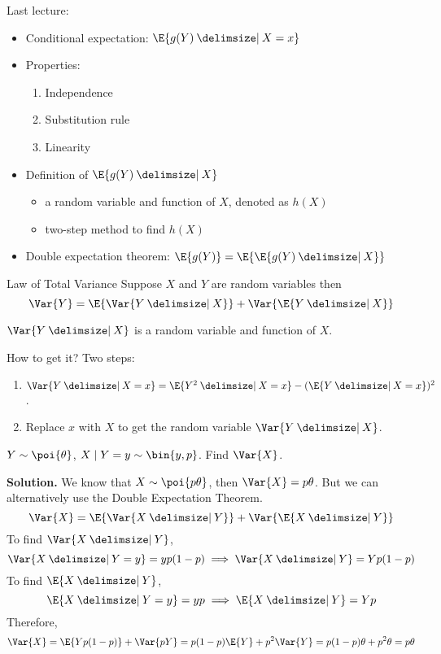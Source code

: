 Last lecture:
\begin{itemize}
    \item Conditional expectation: $ \E{g(Y)\given X=x} $
    \item Properties:
          \begin{enumerate}[label=(\arabic*)]
              \item Independence
              \item Substitution rule
              \item Linearity
          \end{enumerate}
    \item Definition of $ \E{g(Y)\given X} $
          \begin{itemize}
              \item a random variable and function of $ X $, denoted as $ h(X) $
              \item two-step method to find $ h(X) $
          \end{itemize}
    \item Double expectation theorem: $ \E{g(Y)}=\E{\E{g(Y)\given X}} $
\end{itemize}
\begin{Theorem}{Law of Total Variance}{}
    Suppose $ X $ and $ Y $ are random variables then
    \[ \Var{Y}=\E{\Var{Y\given X}}+\Var{\E{Y\given X}} \]
\end{Theorem}
\begin{Remark}{}{}
    $ \Var{Y\given X} $ is a random variable and function of $ X $.

    How to get it? Two steps:
    \begin{enumerate}
        \item $ \Var{Y\given X=x}=\E{Y^2\given X=x}-(\E{Y\given X=x})^2 $.
        \item Replace $ x $ with $ X $ to get
              the random variable $ \Var{Y\given X} $.
    \end{enumerate}
\end{Remark}
\begin{Example}{}{}
    $ Y \sim \poi{\theta} $, $ X\mid Y=y \sim \bin{y,p} $. Find
    $ \Var{X} $.

    \textbf{Solution.} We know that $ X \sim \poi{p\theta} $,
    then $ \Var{X}=p\theta $. But we can alternatively
    use the Double Expectation Theorem.
    \[ \Var{X}=\E{\Var{X\given Y}}+\Var{\E{X\given Y}} \]
    To find $ \Var{X\given Y} $,
    \[ \Var{X\given Y=y}=yp(1-p)\implies \Var{X\given Y}=Yp(1-p) \]
    To find $ \E{X\given Y} $,
    \[ \E{X\given Y=y}=yp\implies \E{X\given Y}=Yp \]
    Therefore,
    \[ \Var{X}=\E{Yp(1-p)}+\Var{pY}=p(1-p)\E{Y}+p^2\Var{Y}=
        p(1-p)\theta+p^2\theta=p\theta \]
\end{Example}
